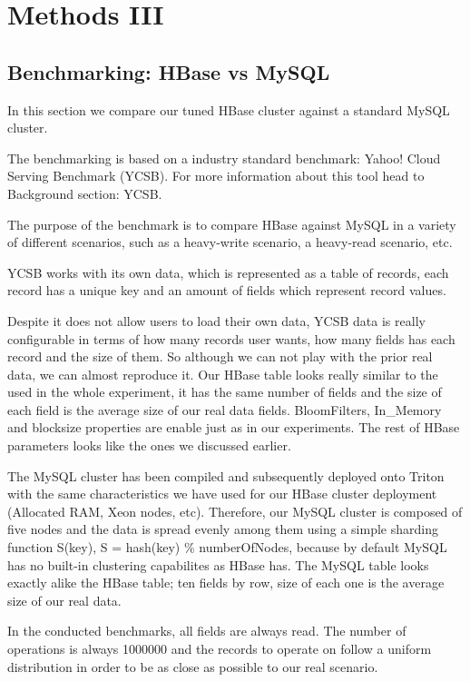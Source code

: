 \chapter{Methods III}
\label{chapter:methods III}
 
\section{Benchmarking: HBase vs MySQL}

In this section we compare our tuned HBase cluster against a standard MySQL cluster.

\bigskip

The benchmarking is based on a industry standard benchmark: Yahoo! Cloud Serving Benchmark (YCSB). For more information about this tool head to Background section: YCSB.
\par
The purpose of the benchmark is to compare HBase against MySQL in a variety of different scenarios, such as a heavy-write scenario, a heavy-read scenario, etc.
\par
YCSB works with its own data, which is represented as a table of records, each record has a unique key and an amount of fields which represent record values.
\par
Despite it does not allow users to load their own data, YCSB data is really configurable in terms of how many records user wants, how many fields has each record and the size of them. So although we can not play with the prior real data, we can almost reproduce it. Our HBase table looks really similar to the used in the whole experiment, it has the same number of fields and the size of each field is the average size of our real data fields. BloomFilters, In\_Memory and blocksize properties are enable just as in our experiments. The rest of HBase parameters looks like the ones we discussed earlier.
\par
The MySQL cluster has been compiled and subsequently deployed onto Triton with the same characteristics we have used for our HBase cluster deployment (Allocated RAM, Xeon nodes, etc). Therefore, our MySQL cluster is composed of five nodes and the data is spread evenly among them using a simple sharding function S(key), S = hash(key) \% numberOfNodes, because by default MySQL has no built-in clustering capabilites as HBase has. The MySQL table looks exactly alike the HBase table; ten fields by row, size of each one is the average size of our real data.

\bigskip

In the conducted benchmarks,  all fields are always read. The number of operations is always 1000000 and the records to operate on follow a uniform distribution in order to be as close as possible to our real scenario.



